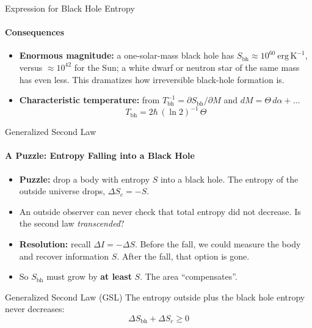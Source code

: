 \documentclass[aspectratio=169]{beamer}
\begin{document}
\begin{frame}{Expression for Black Hole Entropy}
\framesubtitle{Consequences}
\begin{itemize}
  \item \textbf{Enormous magnitude:} a one-solar-mass black hole has $S_{\text{bh}} \approx 10^{60}\ \mathrm{erg\,K^{-1}}$, versus $\approx 10^{42}$ for the Sun; a white dwarf or neutron star of the same mass has even less. This dramatizes how irreversible black-hole formation is.
  \item \textbf{Characteristic temperature:} from $T_{\mathrm{bh}}^{-1} = \partial S_{\text{bh}}/\partial M$ and $dM = \Theta\,d\alpha+\dots$
  \[
    T_{\mathrm{bh}} = 2\hbar\,(\ln 2)^{-1}\,\Theta
  \]


\end{itemize}
\end{frame}

\begin{frame}{Generalized Second Law}
\framesubtitle{A Puzzle: Entropy Falling into a Black Hole}
\begin{itemize}
  \item \textbf{Puzzle:} drop a body with entropy $S$ into a black hole. The entropy of the outside universe drops, $\Delta S_c = -S$.
  \item An outside observer can never check that total entropy did not decrease. Is the second law \emph{transcended}?
  \item \textbf{Resolution:} recall $\Delta I = -\Delta S$. Before the fall, we could measure the body and recover information $S$. After the fall, that option is gone.
  \item So $S_{\text{bh}}$ must grow by \textbf{at least} $S$. The area ``compensates''.
\end{itemize}
\begin{block}{Generalized Second Law (GSL)}
\centering
The entropy outside plus the black hole entropy never decreases:
\[
  \Delta S_{\text{bh}} + \Delta S_c \ge 0
\]
\end{block}
\end{frame}
\end{document}
